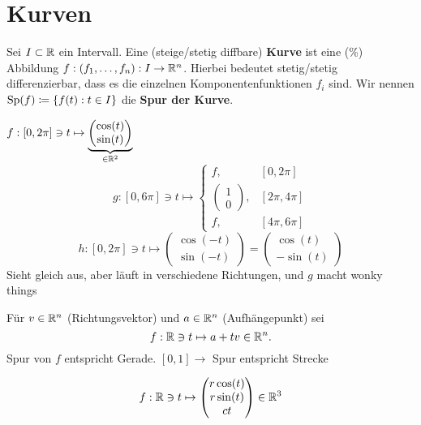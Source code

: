\section{Kurven}

\begin{definition}
	Sei $ I \subset \mathbb{R}  $ ein Intervall.
	Eine (steige/stetig diffbare) \textbf{Kurve} ist eine (\%) Abbildung $ f : (f_1, \dotsc, f_n) : I \to \mathbb{R} ^n $. Hierbei bedeutet stetig/stetig differenzierbar, dass es die einzelnen Komponentenfunktionen $ f_i $ sind. Wir nennen $ \operatorname{Sp}(f) \coloneqq \left\{ f(t) : t \in I \right\}  $ die \textbf{Spur der Kurve}.
\end{definition}

\begin{example}
	$ f : [0, 2 \pi ] \ni t \mapsto \underbrace{\begin{pmatrix} \cos (t) \\ \sin (t) \end{pmatrix} }_{\in \mathbb{R} ^2} $ 
	\[
		g: [0, 6 \pi ] \ni t \mapsto 
		\begin{cases}
			f, & [0, 2 \pi ]\\
			\begin{pmatrix} 1 \\ 0 \end{pmatrix} , & [2 \pi , 4 \pi ]\\
			f, & [4 \pi , 6 \pi ]
		\end{cases}
	\]
	\[
		h : [0, 2 \pi ] \ni t \mapsto \begin{pmatrix} \cos (-t) \\ \sin (-t) \end{pmatrix} = \begin{pmatrix} \cos (t) \\ - \sin (t) \end{pmatrix} 
	\]
	Sieht gleich aus, aber läuft in verschiedene Richtungen, und $ g $ macht wonky things
\end{example}

\begin{example}
	Für $ v \in  \mathbb{R} ^n $ (Richtungsvektor) und $ a \in \mathbb{R} ^n $ (Aufhängepunkt) sei
	\[
		f : \mathbb{R} \ni t \mapsto a + tv \in \mathbb{R} ^n.
	\]
	Spur von $ f $ entspricht Gerade. $ [0, 1] \to  $ Spur entspricht Strecke
\end{example}

\begin{example}[Helicen]
	\[
		f : \mathbb{R}  \ni t \mapsto \begin{pmatrix} r \cos (t) \\ r \sin (t) \\ ct \end{pmatrix} \in \mathbb{R} ^3
	\]
\end{example}

